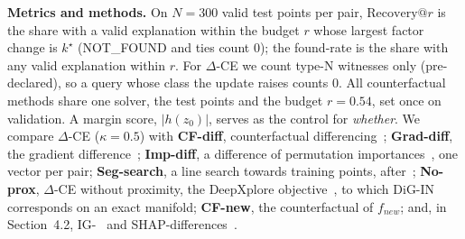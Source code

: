 \documentclass{esannV2}
\begin{document}
\begin{table}[t]
\caption{Adaptation conditions; $k^\star$: ground-truth factor.}
\label{tab:changes}
\centering\footnotesize
{}
\par{}
\end{table}

\textbf{Metrics and methods.} On $N=300$ valid test points per pair, $\mathrm{Recovery@}r$ is the share with a valid explanation within the budget $r$ whose largest factor change is $k^\star$ (NOT\_FOUND and ties count 0); the found-rate is the share with any valid explanation within $r$. For $\Delta$-CE we count type-N witnesses only (pre-declared), so a query whose class the update raises counts 0. All counterfactual methods share one solver, the test points and the budget $r=0.54$, set once on validation. A margin score, $|h(z_0)|$, serves as the control for \emph{whether}. We compare $\Delta$-CE ($\kappa=0.5$) with \textbf{CF-diff}, counterfactual differencing~\cite{artelt1}; \textbf{Grad-diff}, the gradient difference~\cite{artelt1}; \textbf{Imp-diff}, a difference of permutation importances~\cite{muschalik}, one vector per pair; \textbf{Seg-search}, a line search towards training points, after~\cite{renard}; \textbf{No-prox}, $\Delta$-CE without proximity, the DeepXplore objective~\cite{deepxplore}, to which DiG-IN~\cite{digin} corresponds on an exact manifold; \textbf{CF-new}, the counterfactual of $f_{new}$; and, in Section~4.2, IG-~\cite{ig} and SHAP-differences~\cite{shap}.
\end{document}
